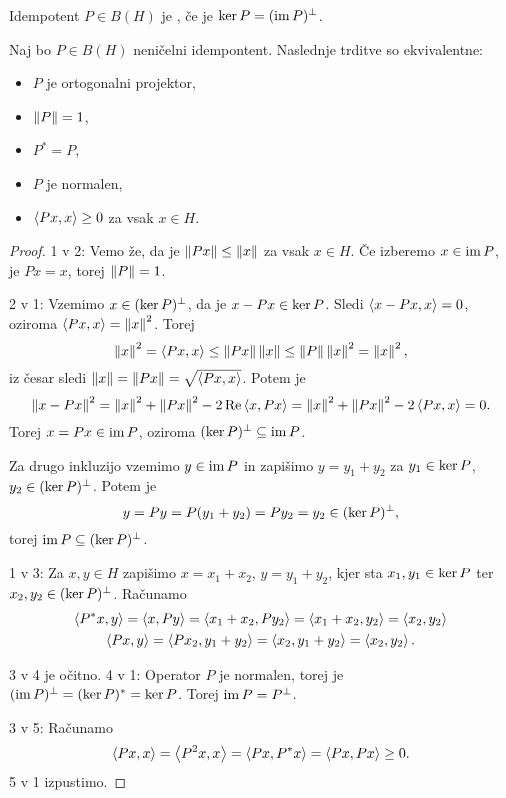 \begin{definicija}
  Idempotent $P \in B(H)$ je , če je $\operatorname{ker} P =
  (\operatorname{im} P)^\bot$.
\end{definicija}

\begin{izrek}
  Naj bo $P \in B(H)$ neničelni idempontent.
  Naslednje trditve so ekvivalentne:
  \begin{itemize}
  \item $P$ je ortogonalni projektor,
  \item $\left\lVert P\right\rVert = 1$,
  \item $P^* = P$,
  \item $P$ je normalen,
  \item $\left< Px, x \right> \ge 0$ za vsak $x \in H$.
  \end{itemize}
\end{izrek}

\begin{proof}
  1 v 2:
  Vemo že, da je $\left\lVert Px\right\rVert \le \left\lVert x\right\rVert$ za vsak $x \in H$.
  Če izberemo $x \in \operatorname{im} P$, je $Px = x$, torej $\left\lVert P\right\rVert = 1$.

  2 v 1:
  Vzemimo $x \in (\operatorname{ker} P)^\bot$, da je $x - Px \in \operatorname{ker} P$.
  Sledi $\left< x - Px, x \right> = 0$, oziroma $\left< Px,x \right> = \left\lVert x\right\rVert^2$.
  Torej
  \[
	\left\lVert x\right\rVert^2 = \left< Px, x \right> \le \left\lVert Px\right\rVert \left\lVert x\right\rVert \le \left\lVert P\right\rVert \left\lVert x\right\rVert^2 =
	\left\lVert x\right\rVert^2,
  \]
  iz česar sledi $\left\lVert x\right\rVert = \left\lVert Px\right\rVert = \sqrt{\left< Px,x \right>}$.
  Potem je
  \[
	\left\lVert x - Px\right\rVert^2 = \left\lVert x\right\rVert^2 + \left\lVert Px\right\rVert^2 - 2 \operatorname{Re} \left< x, Px \right>
	= \left\lVert x\right\rVert^2 + \left\lVert Px\right\rVert^2 - 2 \left< Px,x \right> = 0.
  \]
  Torej $x = Px \in \operatorname{im} P$, oziroma $(\operatorname{ker} P)^\bot \subseteq \operatorname{im} P$.

  Za drugo inkluzijo vzemimo $y \in \operatorname{im} P$ in zapišimo $y = y_1 + y_2$ za $y_1
  \in \operatorname{ker} P$, $y_2 \in (\operatorname{ker} P)^\bot$.
  Potem je
  \[
	y = Py = P(y_1 + y_2) = P y_2 = y_2 \in (\operatorname{ker} P)^\bot,
  \]
  torej $\operatorname{im} P \subseteq (\operatorname{ker} P)^\bot$.

  1 v 3:
  Za $x, y \in H$ zapišimo $x = x_1 + x_2$, $y = y_1 + y_2$, kjer sta $x_1, y_1
  \in \operatorname{ker} P$ ter $x_2, y_2 \in (\operatorname{ker} P)^\bot$.
  Računamo
  \begin{gather*}
	\left< P^* x, y \right> = \left< x, Py \right> = \left< x_1 + x_2, P y_2 \right> = \left< x_1 + x_2, y_2 \right> =
	\left< x_2, y_2 \right> \\
	\left< Px, y \right> = \left< Px_2, y_1 + y_2 \right> = \left< x_2, y_1 + y_2 \right> = \left< x_2, y_2 \right>.
  \end{gather*}

  3 v 4 je očitno.
  4 v 1:
  Operator $P$ je normalen, torej je $(\operatorname{im} P)^\bot = (\operatorname{ker} P)^* = \operatorname{ker} P$.
  Torej $\operatorname{im} P = P^\bot$.

  3 v 5:
  Računamo
  \[
	\left< Px,x \right> = \left< P^2 x, x \right> = \left< Px, P^* x \right> = \left< Px, Px \right> \ge 0.
  \]
  5 v 1 izpustimo.
\end{proof}

